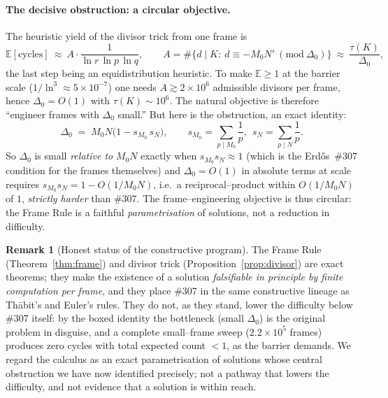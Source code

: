 \documentclass[11pt]{article}
\theoremstyle{definition}
\newtheorem{remark}[theorem]{Remark}
\begin{document}
\paragraph{The decisive obstruction: a circular objective.}
The heuristic yield of the divisor trick from one frame is
\[
\mathbb{E}[\text{cycles}] \ \approx\ A\cdot\frac{1}{\ln r\,\ln p\,\ln q},
\qquad A=\#\{d\mid K:\ d\equiv -M_0N'\ (\mathrm{mod}\ \Delta_0)\}\ \approx\ \frac{\tau(K)}{\Delta_0},
\]
the last step being an equidistribution heuristic. To make $\mathbb{E}\ge1$ at the barrier scale
($1/\ln^3\approx 5\times10^{-7}$) one needs $A\gtrsim 2\times10^6$ admissible divisors per frame,
hence $\Delta_0=O(1)$ with $\tau(K)\sim10^6$. The natural objective is therefore ``engineer frames
with $\Delta_0$ small.'' But here is the obstruction, an exact identity:
\[
\boxed{\ \Delta_0 \;=\; M_0N\bigl(1-s_{M_0}\,s_N\bigr),\qquad
s_{M_0}=\!\!\sum_{p\mid M_0}\!\frac1p,\ \ s_N=\sum_{p\mid N}\frac1p.\ }
\]
So $\Delta_0$ is small \emph{relative to} $M_0N$ exactly when $s_{M_0}s_N\approx1$ (which is the
Erd\H{o}s~\#307 condition for the frames themselves) and $\Delta_0=O(1)$ in absolute terms at
scale requires $s_{M_0}s_N=1-O(1/M_0N)$, i.e.\ a reciprocal--product within $O(1/M_0N)$ of $1$,
\emph{strictly harder} than \#307. The frame--engineering objective is thus circular: the Frame Rule
is a faithful \emph{parametrisation} of solutions, not a reduction in difficulty.

\begin{remark}[Honest status of the constructive program]
The Frame Rule (Theorem~\ref{thm:frame}) and divisor trick (Proposition~\ref{prop:divisor}) are
exact theorems; they make the existence of a solution \emph{falsifiable in principle by finite
computation per frame}, and they place \#307 in the same constructive lineage as Th\=abit's and
Euler's rules. They do not, as they stand, lower the difficulty below \#307 itself: by the boxed
identity the bottleneck (small $\Delta_0$) is the original problem in disguise, and a complete
small--frame sweep ($2.2\times10^5$ frames) produces zero cycles with total expected count $<1$, as
the barrier demands. We regard the calculus as an exact parametrisation of solutions whose central
obstruction we have now identified precisely; not a pathway that lowers the difficulty, and not
evidence that a solution is within reach.
\end{remark}
\end{document}
